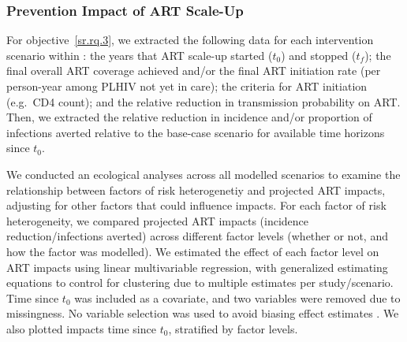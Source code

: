 \subsubsection{Prevention Impact of ART Scale-Up}\label{sr.meth.data.api}
For objective~\ref{sr.rq.3}, we extracted
the following data for each intervention scenario within :
the years that ART scale-up started ($t_0$) and stopped ($t_f$);
the final overall ART coverage achieved and/or
the final ART initiation rate (per person-year among PLHIV not yet in care);
the criteria for ART initiation (e.g.\ CD4 count); and
the relative reduction in transmission probability on ART.
Then, we extracted the
relative reduction in incidence and/or proportion of infections averted
relative to the base-case scenario for available time horizons since $t_0$.
\par
We conducted an ecological analyses across all modelled scenarios to examine the relationship between
factors of risk heterogenetiy and projected ART impacts,
adjusting for other factors that could influence impacts.
For each factor of risk heterogeneity, we compared
projected ART impacts (incidence reduction/infections averted)
across different factor levels (whether or not, and how the factor was modelled).
We estimated the effect of each factor level on ART impacts
using linear multivariable regression, with generalized estimating equations \cite{Hojsgaard2006}
to control for clustering due to multiple estimates per study/scenario.
Time since $t_0$ was included as a covariate, and two variables were removed due to missingness.
No variable selection was used to avoid biasing effect estimates \cite{Harrell2001}.
We also plotted impacts \vs time since $t_0$, stratified by factor levels.
